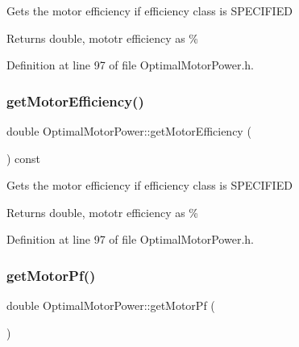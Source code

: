 Gets the motor efficiency if efficiency class is S\+P\+E\+C\+I\+F\+I\+ED

\begin{DoxyReturn}{Returns}
double, mototr efficiency as \% 
\end{DoxyReturn}


Definition at line 97 of file Optimal\+Motor\+Power.\+h.

\mbox{\label{class_optimal_motor_power_a10b3528bec621cab146608c6326526e3}} 
\subsubsection{\texorpdfstring{get\+Motor\+Efficiency()}{getMotorEfficiency()}\hspace{0.1cm}{\footnotesize\ttfamily [3/3]}}
{\footnotesize\ttfamily double Optimal\+Motor\+Power\+::get\+Motor\+Efficiency (\begin{DoxyParamCaption}{ }\end{DoxyParamCaption}) const\hspace{0.3cm}{\ttfamily [inline]}}

Gets the motor efficiency if efficiency class is S\+P\+E\+C\+I\+F\+I\+ED

\begin{DoxyReturn}{Returns}
double, mototr efficiency as \% 
\end{DoxyReturn}


Definition at line 97 of file Optimal\+Motor\+Power.\+h.

\mbox{\label{class_optimal_motor_power_a94d4c8a84c1bd19b799e35b966368f5a}} 
\subsubsection{\texorpdfstring{get\+Motor\+Pf()}{getMotorPf()}\hspace{0.1cm}{\footnotesize\ttfamily [1/3]}}
{\footnotesize\ttfamily double Optimal\+Motor\+Power\+::get\+Motor\+Pf (\begin{DoxyParamCaption}{ }\end{DoxyParamCaption})\hspace{0.3cm}{\ttfamily [inline]}}

